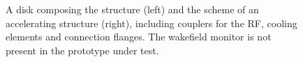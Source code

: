  \begin{figure}[h]
 \centering
 \hspace{5mm}
 \caption{A disk composing the structure (left) and the scheme of an accelerating structure (right), including couplers for the RF, cooling elements and connection flanges. The wakefield monitor is not present in the prototype under test.}
 \label{CLICdisk}
 
 \end{figure}
 
